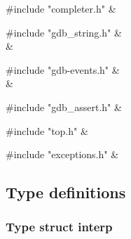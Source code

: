 \medskip
\begin{cxreftabi}
{\stt \#include "completer.h"} &\\
\end{cxreftabi}

\medskip
\begin{cxreftabi}
{\stt \#include "gdb\_string.h"} &\\
\hspace*{0.2in}{\stt \#include <string.h>} &\\
\end{cxreftabi}

\medskip
\begin{cxreftabi}
{\stt \#include "gdb-events.h"} &\\
\hspace*{0.2in}{\stt \#include "../include/ansidecl.h"} &\\
\end{cxreftabi}

\medskip
\begin{cxreftabi}
{\stt \#include "gdb\_assert.h"} &\\
\end{cxreftabi}

\medskip
\begin{cxreftabi}
{\stt \#include "top.h"} &\\
\end{cxreftabi}

\medskip
\begin{cxreftabi}
{\stt \#include "exceptions.h"} &\\
\end{cxreftabi}


\subsection{Type definitions}


\subsubsection{Type struct interp}
\label{type_struct_interp_interps.c}

